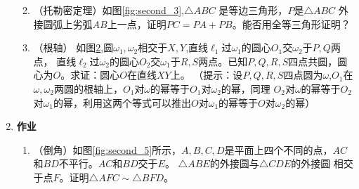 \documentclass[12pt]{article}
\begin{document}
\begin{enumerate}
\begin{enumerate}[label=(\alph*)]
\begin{figure}[!ht]
\begin{subfigure}[b]{0.45\textwidth}
    \caption{}\label{fig:second_4}
    \end{subfigure}
    \caption{}
    \end{figure}

\item
（托勒密定理）如图\ref{fig:second_3},$\triangle ABC$ 是等边三角形，$P$是$\triangle ABC$ 外接圆弧上劣弧$AB$上一点，证明$PC=PA+PB$。能否用全等三角形证明？

\item （根轴）
如图\ref{fig:second_4},圆$\omega_1,\omega_2$相交于$X,Y$,直线$\ell_1$过$\omega_1$的圆心$O_1$交$\omega_2$于$P,Q$两点，
直线$\ell_2$过$\omega_2$的圆心$O_2$交$\omega_1$于$R,S$两点。已知$P,Q,R,S$四点共圆，圆心为$O$。求证：圆心$O$在直线$XY$上。
（提示：设$P,Q,R,S$四点圆为$\omega$,$O_1$在$\omega,\omega_2$两圆的根轴上，$O_1$对$\omega$的幂等于$O_1$对$\omega_2$的幂，同理
$O_2$对$\omega$的幂等于$O_2$对$\omega_1$的幂，利用这两个等式可以推出$O$对$\omega_1$的幂等于$O$对$\omega_2$的幂）
\end{enumerate}
\item \textbf{作业}
\begin{enumerate}[label=(\alph*)]
\item （倒角）如图\ref{fig:second_5}所示，$A,B,C,D$是平面上四个不同的点，$AC$和$BD$不平行。$AC$和$BD$交于$E$。
$\triangle ABE$的外接圆与$\triangle CDE$的外接圆 相交于点$F$。证明$\triangle AFC \sim \triangle BFD$。


\end{enumerate}
\end{enumerate}
\end{document}
